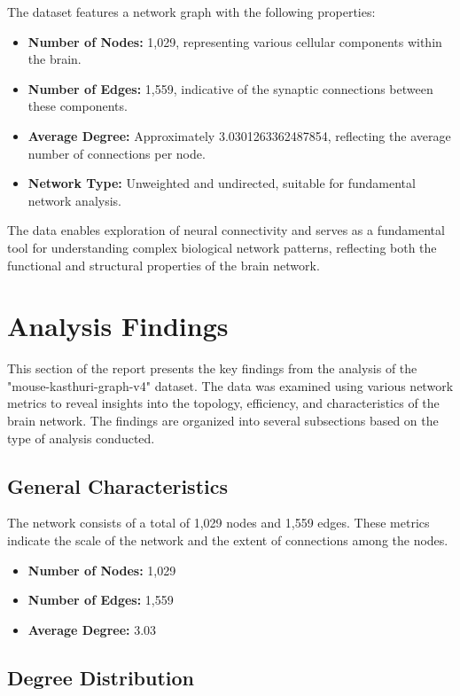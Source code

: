 \documentclass[
	report, %
	11pt, %
]{CSUniSchoolLabReport}
\begin{document}
		The dataset features a network graph with the following properties:
		\begin{itemize}
			\item \textbf{Number of Nodes:} 1,029, representing various cellular components within the brain.
			\item \textbf{Number of Edges:} 1,559, indicative of the synaptic connections between these components.
			\item \textbf{Average Degree:} Approximately \num{3.0301263362487854}, reflecting the average number of connections per node.
			\item \textbf{Network Type:} Unweighted and undirected, suitable for fundamental network analysis.
		\end{itemize}
		\vspace{10pt}
		
		The data enables exploration of neural connectivity and serves as a fundamental tool for understanding complex biological network patterns, reflecting both the functional and structural properties of the brain network.
		
\section{Analysis Findings}

This section of the report presents the key findings from the analysis of the "mouse-kasthuri-graph-v4" dataset. The data was examined using various network metrics to reveal insights into the topology, efficiency, and characteristics of the brain network. The findings are organized into several subsections based on the type of analysis conducted.

	\subsection{General Characteristics}

	The network consists of a total of 1,029 nodes and 1,559 edges. These metrics indicate the scale of the network and the extent of connections among the nodes.

	\begin{itemize}
		\item \textbf{Number of Nodes:} 1,029
		\item \textbf{Number of Edges:} 1,559
		\item \textbf{Average Degree:} 3.03
	\end{itemize}

	\subsection{Degree Distribution}
\end{document}
